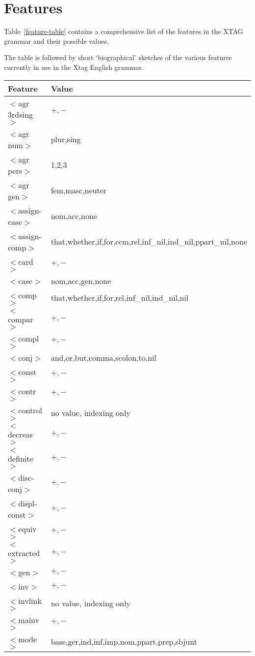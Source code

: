 \chapter{Features}
\label{features}

Table~\ref{feature-table} contains a comprehensive list of the features in the
XTAG grammar and their possible values.

The table is followed by short `biographical' sketches of the various features
currently in use in the Xtag English grammar.

\footnotesize
\begin{table}[hbt]
\centering
\begin{tabular}{|l|l|}
\hline
Feature&Value\\
\hline
\hline
$<$agr 3rdsing$>$&$+,-$\\
$<$agr num$>$&plur,sing\\
$<$agr pers$>$&1,2,3\\
$<$agr gen$>$&fem,masc,neuter\\
$<$assign-case$>$&nom,acc,none\\
$<$assign-comp$>$&that,whether,if,for,ecm,rel,inf\_nil,ind\_nil,ppart\_nil,none\\
$<$card$>$&$+,-$\\
$<$case$>$&nom,acc,gen,none\\
$<$comp$>$&that,whether,if,for,rel,inf\_nil,ind\_nil,nil\\
$<$compar$>$&$+,-$\\
$<$compl$>$&$+,-$\\
$<$conj$>$&and,or,but,comma,scolon,to,nil\\
$<$const$>$&$+,-$\\
$<$contr$>$&$+,-$\\
$<$control$>$&no value, indexing only\\
$<$decreas$>$&$+,-$\\
$<$definite$>$&$+,-$\\
$<$disc-conj$>$&$+, -$\\
$<$displ-const$>$&$+,-$\\
$<$equiv$>$&$+,-$\\
$<$extracted$>$&$+,-$\\
$<$gen$>$&$+,-$\\
$<$inv$>$&$+,-$\\
$<$invlink$>$&no value, indexing only\\
$<$mainv$>$&$+,-$\\
$<$mode$>$&base,ger,ind,inf,imp,nom,ppart,prep,sbjunt\\

\end{tabular}
\end{table}
